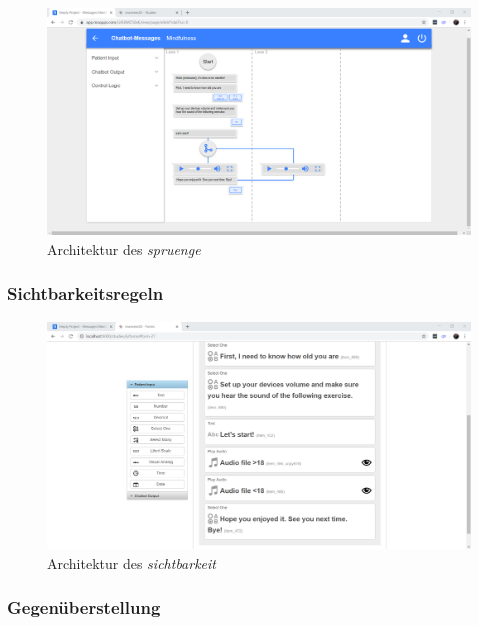 \begin{figure}[h]
\centering
\includegraphics[width=1\textwidth]{pictures/spruenge}
\caption{Architektur des \emph{spruenge}}
\label{spruenge}
\end{figure}


\subsubsection{Sichtbarkeitsregeln}

\begin{figure}[h]
\centering
\includegraphics[width=1\textwidth]{pictures/sichtbarkeit}
\caption{Architektur des \emph{sichtbarkeit}}
\label{sichtbarkeit}
\end{figure}


\subsubsection{Gegenüberstellung}

